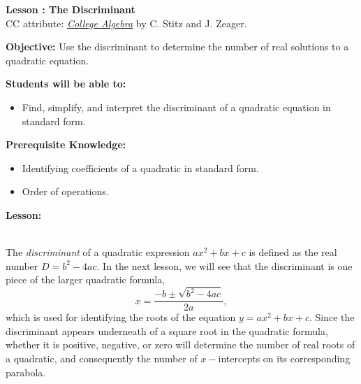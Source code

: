 \documentclass[12pt]{article}
\theoremstyle{definition}
\begin{document}
{\bf \large Lesson : The Discriminant}\label{les:the_discriminant}
\\ CC attribute: \href{http://www.stitz-zeager.com}{\it{College Algebra}} by C. Stitz and J. Zeager. 
\hfill \doclicenseImage[imagewidth=5em]\\
\par
{\bf Objective:} Use the discriminant to determine the number of real solutions to a quadratic equation.\\
\par
{\bf Students will be able to:}
\begin{itemize}
	\item Find, simplify, and interpret the discriminant of a quadratic equation in standard form.
\end{itemize}
{\bf Prerequisite Knowledge:}
\begin{itemize}
	\item Identifying coefficients of a quadratic in standard form.
	\item Order of operations.
\end{itemize}
\hrulefill

{\bf Lesson:}\\
\ \par
The {\it discriminant} of a quadratic expression $ax^2+bx+c$ is defined as the real number $D=b^2-4ac$.  In the next lesson, we will see that the discriminant is one piece of the larger quadratic formula,
$$x=\dfrac{-b\pm\sqrt{b^2-4ac}}{2a},$$
which is used for identifying the roots of the equation $y=ax^2+bx+c$.
Since the discriminant appears underneath of a square root in the quadratic formula, whether it is positive, negative, or zero will determine the number of real roots of a quadratic, and consequently the number of $x-$intercepts on its corresponding parabola.

\begin{center}
\end{center}
\end{document}
